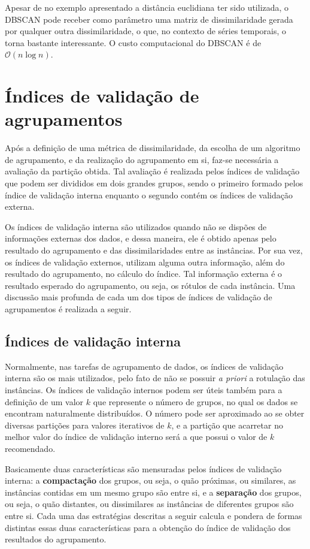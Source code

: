 Apesar de no exemplo apresentado a distância euclidiana ter sido utilizada, o DBSCAN pode receber como parâmetro uma matriz de dissimilaridade gerada por qualquer outra dissimilaridade, o que, no contexto de séries temporais, o torna bastante interessante. O custo computacional do DBSCAN é de $\mathcal{O}(n \log n)$.

\section{Índices de validação de agrupamentos}

Após a definição de uma métrica de dissimilaridade, da escolha de um algoritmo de agrupamento, e da realização do agrupamento em si, faz-se necessária a avaliação da partição obtida. Tal avaliação é realizada pelos índices de validação que podem ser divididos em dois grandes grupos, sendo o primeiro formado pelos índice de validação interna enquanto o segundo contém os índices de validação externa. 

Os índices de validação interna são utilizados quando não se dispões de informações externas dos dados, e dessa maneira, ele é obtido apenas pelo resultado do agrupamento e das dissimilaridades entre as instâncias. Por sua vez, os índices de validação externos, utilizam alguma outra informação, além do resultado do agrupamento, no cálculo do índice. Tal informação externa é o resultado esperado do agrupamento, ou seja, os rótulos de cada instância. Uma discussão mais profunda de cada um dos tipos de índices de validação de agrupamentos é realizada a seguir.

\subsection{Índices de validação interna} \label{sec:indice_validacao_interna}

Normalmente, nas tarefas de agrupamento de dados, os índices de validação interna são os mais utilizados, pelo fato de não se possuir \emph{a priori} a rotulação das instâncias. Os índices de validação internos podem ser úteis também para a definição de um valor $k$ que represente o número de grupos, no qual os dados se encontram naturalmente distribuídos. O número pode ser aproximado ao se obter diversas partições para valores iterativos de $k$, e a partição que acarretar no melhor valor do índice de validação interno será a que possui o valor de $k$ recomendado.

Basicamente duas características são mensuradas pelos índices de validação interna: a \textbf{compactação} dos grupos, ou seja, o quão próximas, ou similares, as instâncias contidas em um mesmo grupo são entre si, e a \textbf{separação} dos grupos, ou seja, o quão distantes, ou dissimilares as instâncias de diferentes grupos são entre si. Cada uma das estratégias descritas a seguir calcula e pondera de formas distintas essas duas características para a obtenção do índice de validação dos resultados do agrupamento.

